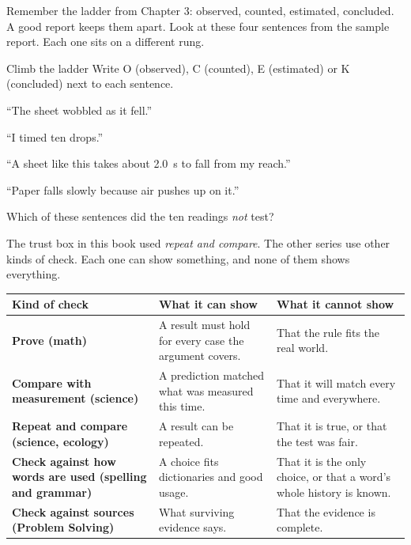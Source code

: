 Remember the ladder from Chapter 3: observed, counted, estimated, concluded. A good report keeps them apart. Look at these four sentences from the sample report. Each one sits on a different rung.

\clearpage
\begin{puzzle}{Climb the ladder}
Write O (observed), C (counted), E (estimated) or K (concluded) next to each sentence.
\begin{description}[leftmargin=1.6em,itemsep=0.3em,style=sameline]
\item[(a)] ``The sheet wobbled as it fell.'' \wline[1cm]
\item[(b)] ``I timed ten drops.'' \wline[1cm]
\item[(c)] ``A sheet like this takes about 2.0~s to fall from my reach.'' \wline[1cm]
\item[(d)] ``Paper falls slowly because air pushes up on it.'' \wline[1cm]
\end{description}
Which of these sentences did the ten readings \emph{not} test? \wline[3cm]
\end{puzzle}

The trust box in this book used \emph{repeat and compare}. The other series use other kinds of check. Each one can show something, and none of them shows everything.

\renewcommand{\arraystretch}{1.35}
\begin{center}
\sffamily\scriptsize
\begin{tabularx}{\textwidth}{>{\bfseries}p{2.4cm}XX}
\toprule
\textbf{Kind of check} & \textbf{What it can show} & \textbf{What it cannot show}\\
\midrule
Prove (math) & A result must hold for every case the argument covers. & That the rule fits the real world.\\
Compare with measurement (science) & A prediction matched what was measured this time. & That it will match every time and everywhere.\\
Repeat and compare (science, ecology) & A result can be repeated. & That it is true, or that the test was fair.\\
Check against how words are used (spelling and grammar) & A choice fits dictionaries and good usage. & That it is the only choice, or that a word's whole history is known.\\
Check against sources (Problem Solving) & What surviving evidence says. & That the evidence is complete.\\
\bottomrule
\end{tabularx}
\end{center}

